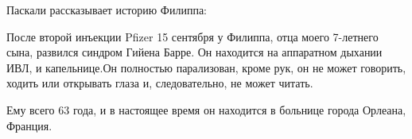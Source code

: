 Паскали рассказывает историю Филиппа:

После второй инъекции Pfizer 15 сентября у Филиппа, отца моего 7-летнего сына,
развился синдром Гийена Барре. Он находится на аппаратном дыхании ИВЛ, и
капельнице.Он полностью парализован, кроме рук, он не может говорить, ходить или
открывать глаза и, следовательно, не может читать.

Ему всего 63 года, и в настоящее время он находится в больнице города Орлеана,
Франция.
